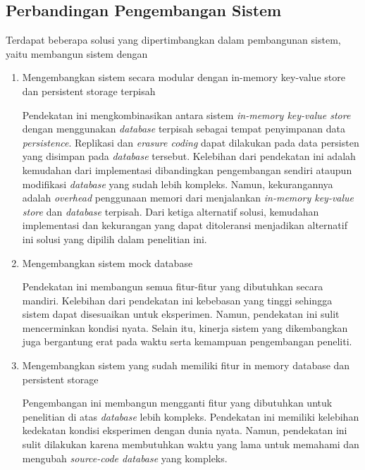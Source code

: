 
\subsection{Perbandingan Pengembangan Sistem}
\label{subsection:perbandingan-pengembangan-sistem}

Terdapat beberapa solusi yang dipertimbangkan dalam pembangunan sistem, yaitu membangun sistem dengan 

\begin{enumerate}
  \item Mengembangkan sistem secara modular dengan in-memory key-value store dan persistent storage terpisah
  
  Pendekatan ini mengkombinasikan antara sistem \textit{in-memory key-value store} dengan menggunakan \textit{database} terpisah sebagai tempat penyimpanan data \textit{persistence}. Replikasi dan \textit{erasure coding} dapat dilakukan pada data persisten yang disimpan pada \textit{database} tersebut. Kelebihan dari pendekatan ini adalah kemudahan dari implementasi dibandingkan pengembangan sendiri ataupun modifikasi \textit{database} yang sudah lebih kompleks. Namun, kekurangannya adalah \textit{overhead} penggunaan memori dari menjalankan \textit{in-memory key-value store} dan \textit{database} terpisah. Dari ketiga alternatif solusi, kemudahan implementasi dan kekurangan yang dapat ditoleransi menjadikan alternatif ini solusi yang dipilih dalam penelitian ini.


  \item Mengembangkan sistem mock database
  
  Pendekatan ini membangun semua fitur-fitur yang dibutuhkan secara mandiri. Kelebihan dari pendekatan ini kebebasan yang tinggi sehingga sistem dapat disesuaikan untuk eksperimen. Namun, pendekatan ini sulit mencerminkan kondisi nyata. Selain itu, kinerja sistem yang dikembangkan juga bergantung erat pada waktu serta kemampuan pengembangan peneliti.

  \item Mengembangkan sistem yang sudah memiliki fitur in memory database dan persistent storage
  
  Pengembangan ini membangun mengganti fitur yang dibutuhkan untuk penelitian di atas \textit{database} lebih kompleks. Pendekatan ini memiliki kelebihan kedekatan kondisi eksperimen dengan dunia nyata. Namun, pendekatan ini sulit dilakukan karena membutuhkan waktu yang lama untuk memahami dan mengubah \textit{source-code database} yang kompleks.
\end{enumerate}